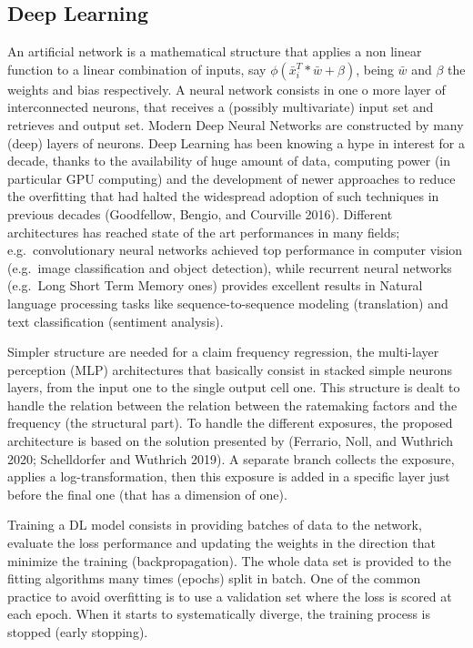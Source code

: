 \documentclass[
]{article}
\begin{document}
\hypertarget{deep-learning}{%
\subsection{Deep Learning}\label{deep-learning}}

An artificial network is a mathematical structure that applies a non
linear function to a linear combination of inputs, say
\(\phi\left(\bar x_i^T*\bar w+\beta\right)\), being \(\bar w\) and
\(\beta\) the weights and bias respectively. A neural network consists
in one o more layer of interconnected neurons, that receives a (possibly
multivariate) input set and retrieves and output set. Modern Deep Neural
Networks are constructed by many (deep) layers of neurons. Deep Learning
has been knowing a hype in interest for a decade, thanks to the
availability of huge amount of data, computing power (in particular GPU
computing) and the development of newer approaches to reduce the
overfitting that had halted the widespread adoption of such techniques
in previous decades (Goodfellow, Bengio, and Courville 2016). Different
architectures has reached state of the art performances in many fields;
e.g.~convolutionary neural networks achieved top performance in computer
vision (e.g.~image classification and object detection), while recurrent
neural networks (e.g.~Long Short Term Memory ones) provides excellent
results in Natural language processing tasks like sequence-to-sequence
modeling (translation) and text classification (sentiment analysis).

Simpler structure are needed for a claim frequency regression, the
multi-layer perception (MLP) architectures that basically consist in
stacked simple neurons layers, from the input one to the single output
cell one. This structure is dealt to handle the relation between the
relation between the ratemaking factors and the frequency (the
structural part). To handle the different exposures, the proposed
architecture is based on the solution presented by (Ferrario, Noll, and
Wuthrich 2020; Schelldorfer and Wuthrich 2019). A separate branch
collects the exposure, applies a log-transformation, then this exposure
is added in a specific layer just before the final one (that has a
dimension of one).

Training a DL model consists in providing batches of data to the
network, evaluate the loss performance and updating the weights in the
direction that minimize the training (backpropagation). The whole data
set is provided to the fitting algorithms many times (epochs) split in
batch. One of the common practice to avoid overfitting is to use a
validation set where the loss is scored at each epoch. When it starts to
systematically diverge, the training process is stopped (early
stopping).
\end{document}
